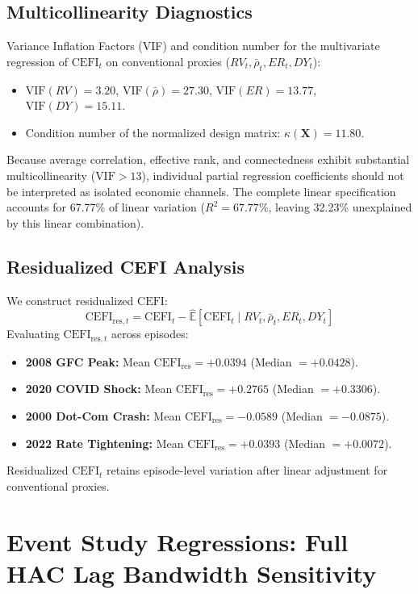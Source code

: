 \documentclass[12pt]{article}
\begin{document}
\subsection{Multicollinearity Diagnostics}
Variance Inflation Factors (VIF) and condition number for the multivariate regression of $\mathrm{CEFI}_t$ on conventional proxies ($RV_t, \bar{\rho}_t, ER_t, DY_t$):
\begin{itemize}
    \item $\text{VIF}(RV) = 3.20$, $\text{VIF}(\bar{\rho}) = 27.30$, $\text{VIF}(ER) = 13.77$, $\text{VIF}(DY) = 15.11$.
    \item Condition number of the normalized design matrix: $\kappa(\mathbf{X}) = 11.80$.
\end{itemize}
Because average correlation, effective rank, and connectedness exhibit substantial multicollinearity ($\text{VIF} > 13$), individual partial regression coefficients should not be interpreted as isolated economic channels. The complete linear specification accounts for 67.77\% of linear variation ($R^2 = 67.77\%$, leaving 32.23\% unexplained by this linear combination).

\subsection{Residualized CEFI Analysis}
We construct residualized $\mathrm{CEFI}$:
\begin{equation}
\mathrm{CEFI}_{\text{res},t} = \mathrm{CEFI}_t - \hat{\mathbb{E}}[\mathrm{CEFI}_t \mid RV_t, \bar{\rho}_t, ER_t, DY_t]
\end{equation}
Evaluating $\mathrm{CEFI}_{\text{res},t}$ across episodes:
\begin{itemize}
    \item \textbf{2008 GFC Peak:} Mean $\mathrm{CEFI}_{\text{res}} = +0.0394$ (Median $= +0.0428$).
    \item \textbf{2020 COVID Shock:} Mean $\mathrm{CEFI}_{\text{res}} = +0.2765$ (Median $= +0.3306$).
    \item \textbf{2000 Dot-Com Crash:} Mean $\mathrm{CEFI}_{\text{res}} = -0.0589$ (Median $= -0.0875$).
    \item \textbf{2022 Rate Tightening:} Mean $\mathrm{CEFI}_{\text{res}} = +0.0393$ (Median $= +0.0072$).
\end{itemize}
Residualized $\mathrm{CEFI}_t$ retains episode-level variation after linear adjustment for conventional proxies.

\section{Event Study Regressions: Full HAC Lag Bandwidth Sensitivity}
\label{app:hac_bandwidth}
\end{document}
